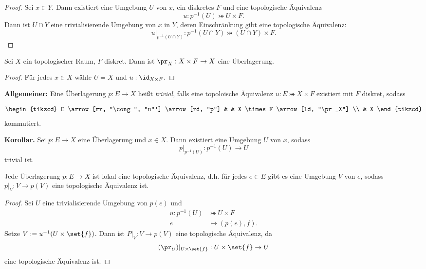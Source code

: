 \documentclass[language=ngerman]{TemplateLecture} %
\begin{document}
\begin{proof}
    Sei $x \in Y$. Dann existiert eine Umgebung $U$ von $x$, ein diskretes $F$ und eine topologische Äquivalenz
    \begin{equation*}
        u: p^{-1}(U) \bij U \times F.
    \end{equation*}
    Dann ist $U \cap Y$ eine trivialisierende Umgebung von $x$ in $Y$, deren Einschränkung gibt eine topologische Äquivalenz:
    \begin{equation*}
        u|_{p^{-1}(U \cap Y)}: p^{-1}(U \cap Y) \bij (U \cap Y) \times F.
    \end{equation*}
\end{proof}

\begin{example}
    Sei $X$ ein topologischer Raum, $F$ diskret. Dann ist $\pr_X: X \times F \to X$ eine Überlagerung.
\end{example}
\begin{proof}
    Für jedes $x \in X$ wähle $U = X$ und $u: \id_{X \times F}$.
\end{proof}
\textbf{Allgemeiner:} Eine Überlagerung $p: E \to X$ heißt \emph{trivial}, falls eine topoloische Äquivalenz $u: E \bij X \times F$ existiert mit $F$ diskret, sodass 

\begin{equation*}
    \begin{tikzcd}
        E \arrow[rr, "\cong", "u"'] \arrow[rd, "p"] & & X \times F \arrow[ld, "\pr_X"] \\ 
         & X
    \end{tikzcd}
\end{equation*}
kommutiert.

\textbf{Korollar.} Sei $p: E \to X$ eine Überlagerung und $x \in X$. Dann existiert eine Umgebung $U$ von $x$, sodass
\begin{equation*}
    p|_{p^{-1}(U)}: p^{-1}(U) \to U
\end{equation*}
trivial ist.

\begin{remark}
    Jede Überlagerung $p: E \to X$ ist lokal eine topologische Äquivalenz, d.h. für jedes $e \in E$ gibt es eine Umgebung $V$ von $e$, sodass $p|_V: V \to p(V)$ eine topologische Äquivalenz ist.
\end{remark}

\begin{proof}
    Sei $U$ eine trivialisierende Umgebung von $p(e)$ und 
    \begin{align*}
        u: p^{-1}(U) &\bij U \times F \\
        e &\mapsto  (p(e), f).
    \end{align*}
    Setze $V := u^{-1}(U \times \set{f})$. Dann ist $P|_V : V \to p(V)$ eine topologische Äquivalenz, da 
    \begin{equation*}
        (\pr_U)|_{U \times \set{f}}: U \times \set{f} \to U
    \end{equation*}
    eine topologische Äquivalenz ist.
\end{proof}
\end{document}
